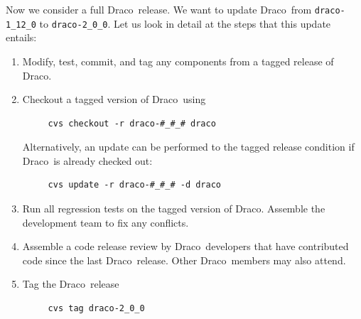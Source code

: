 \documentclass[11pt]{nmemo}
\newcommand{\draco}{{\normalfont\normalsize\sffamily Draco}}
\newcommand{\stable}{{\normalfont\normalsize\ttfamily last\_stable}}
\begin{document}
Now we consider a full \draco\ release.  We want to update \draco\
from \texttt{draco-1\_12\_0} to \texttt{draco-2\_0\_0}.  Let us look
in detail at the steps that this update entails:
\begin{enumerate}
\item Modify, test, commit, and tag any components from a tagged
  release of \draco.
\item Checkout a tagged version of \draco\ using
\begin{verbatim}
     cvs checkout -r draco-#_#_# draco
\end{verbatim}
  Alternatively, an update can be performed to the tagged release
  condition if \draco\ is already checked out:
\begin{verbatim}
     cvs update -r draco-#_#_# -d draco
\end{verbatim}
\item Run all regression tests on the tagged version of \draco.
  Assemble the development team to fix any conflicts. 
\item Assemble a code release review by \draco\ developers that have
  contributed code since the last \draco\ release.  Other \draco\ 
  members may also attend.
\item Tag the \draco\ release
\begin{verbatim}
     cvs tag draco-2_0_0
\end{verbatim}
\end{enumerate}
\end{document}
